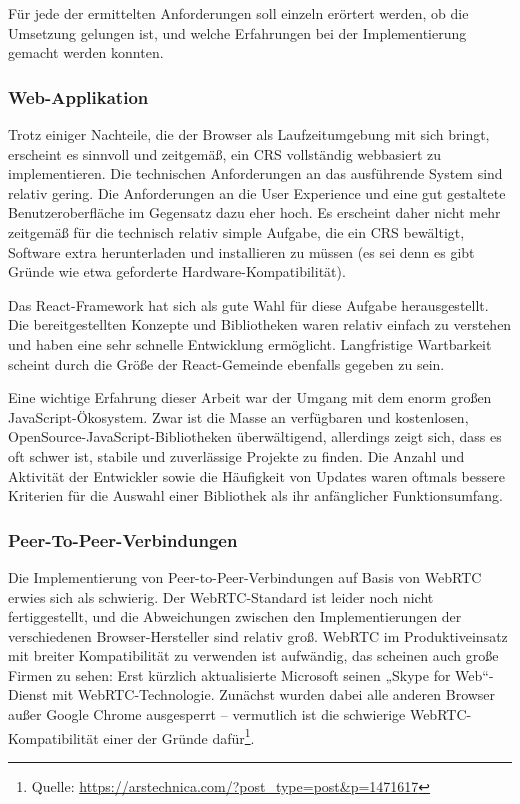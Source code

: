 Für jede der ermittelten Anforderungen soll einzeln erörtert werden, ob die Umsetzung gelungen ist, und welche Erfahrungen bei der Implementierung gemacht werden konnten.

\subsubsection*{Web-Applikation}
Trotz einiger Nachteile, die der Browser als Laufzeitumgebung mit sich bringt, erscheint es sinnvoll und zeitgemäß, ein CRS vollständig webbasiert zu implementieren. Die technischen Anforderungen an das ausführende System sind relativ gering. Die Anforderungen an die User Experience und eine gut gestaltete Benutzeroberfläche im Gegensatz dazu eher hoch. Es erscheint daher nicht mehr zeitgemäß für die technisch relativ simple Aufgabe, die ein CRS bewältigt, Software extra herunterladen und installieren zu müssen (es sei denn es gibt Gründe wie etwa geforderte Hardware-Kompatibilität).

Das React-Framework hat sich als gute Wahl für diese Aufgabe herausgestellt. Die bereitgestellten Konzepte und Bibliotheken waren relativ einfach zu verstehen und haben eine sehr schnelle Entwicklung ermöglicht. Langfristige Wartbarkeit scheint durch die Größe der React-Gemeinde ebenfalls gegeben zu sein.

Eine wichtige Erfahrung dieser Arbeit war der Umgang mit dem enorm großen JavaScript-Ökosystem. Zwar ist die Masse an verfügbaren und kostenlosen, OpenSource-JavaScript-Bibliotheken überwältigend, allerdings zeigt sich, dass es oft schwer ist, stabile und zuverlässige Projekte zu finden. Die Anzahl und Aktivität der Entwickler sowie die Häufigkeit von Updates waren oftmals bessere Kriterien für die Auswahl einer Bibliothek als ihr anfänglicher Funktionsumfang.

\subsubsection*{Peer-To-Peer-Verbindungen}
Die Implementierung von Peer-to-Peer-Verbindungen auf Basis von WebRTC erwies sich als schwierig. Der WebRTC-Standard ist leider noch nicht fertiggestellt, und die Abweichungen zwischen den Implementierungen der verschiedenen Browser-Hersteller sind relativ groß. WebRTC im Produktiveinsatz mit breiter Kompatibilität zu verwenden ist aufwändig, das scheinen auch große Firmen zu sehen: Erst kürzlich aktualisierte Microsoft seinen „Skype for Web“-Dienst mit WebRTC-Technologie. Zunächst wurden dabei alle anderen Browser außer Google Chrome ausgesperrt – vermutlich ist die schwierige WebRTC-Kompatibilität einer der Gründe dafür\footnote{Quelle: \url{https://arstechnica.com/?post_type=post&p=1471617}}.

